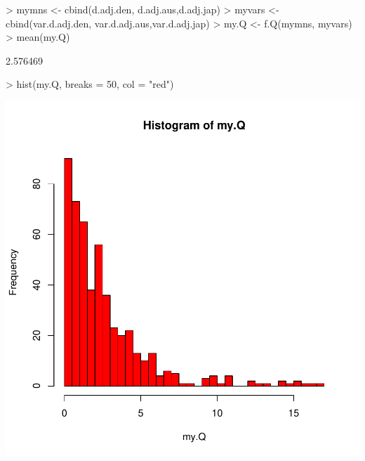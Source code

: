 \documentclass[a4paper]{report}
\begin{document}
\begin{center}
\begin{Schunk}
\begin{Sinput}
> mymns <- cbind(d.adj.den, d.adj.aus,d.adj.jap)
> myvars <- cbind(var.d.adj.den, var.d.adj.aus,var.d.adj.jap)
> my.Q <- f.Q(mymns, myvars)
> mean(my.Q)
\end{Sinput}
\begin{Soutput}
[1] 2.576469
\end{Soutput}
\begin{Sinput}
> hist(my.Q, breaks = 50, col = "red")
\end{Sinput}
\end{Schunk}
\includegraphics{MAMA_full-014}
\end{center}
\end{document}
